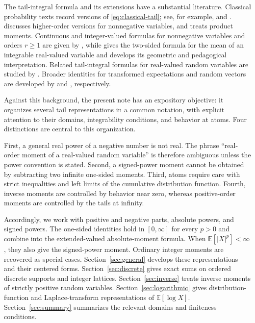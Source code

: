 \documentclass[11pt]{article}
\theoremstyle{definition}
\theoremstyle{remark}
\newcommand{\E}{\mathbb{E}}
\newcommand{\abs}[1]{\left\lvert #1\right\rvert}
\begin{document}
The tail-integral formula and its extensions have a substantial literature.
Classical probability texts record versions of \eqref{eq:classical-tail};
see, for example, \citet{Feller1971} and \citet{Shorack2000}.
\citet{Hong2012} discusses higher-order versions for nonnegative variables,
and \citet{Hong2015} treats product moments.  Continuous and integer-valued
formulas for nonnegative variables and orders $r\geq1$ are given by
\citet{Chakraborti2019},
while \citet[Proposition~2.1]{Lo2019} gives the two-sided formula for the
mean of an integrable real-valued variable and develops its geometric and
pedagogical interpretation.  Related tail-integral formulas for real-valued
random variables are studied by \citet{NadarajahOkorie2022}.  Broader
identities for transformed expectations and random vectors are developed by
\citet{Liu2020} and \citet{Ogasawara2020}, respectively.

Against this background, the present note has an expository objective: it
organizes several tail representations in a common notation, with explicit
attention to their domains, integrability conditions, and behavior at atoms.
Four distinctions are central to this organization.

First, a general real power of a negative number is not real.  The phrase
``real-order moment of a real-valued random variable'' is therefore
ambiguous unless the power convention is stated.  Second, a signed-power
moment cannot be obtained by subtracting two infinite one-sided moments.
Third, atoms require care with strict inequalities and left limits of the
cumulative distribution function.  Fourth, inverse moments are controlled
by behavior near zero, whereas positive-order moments are controlled by
the tails at infinity.

Accordingly, we work with positive and negative parts, absolute powers, and
signed powers.  The one-sided identities hold in $[0,\infty]$ for every
$p>0$ and combine into the extended-valued absolute-moment formula.  When
$\E[\abs{X}^p]<\infty$, they also give the signed-power moment.  Ordinary integer
moments are recovered as special cases.  Section~\ref{sec:general} develops
these representations and
their centered forms.  Section~\ref{sec:discrete} gives exact sums on ordered
discrete supports and integer lattices.  Section~\ref{sec:inverse} treats
inverse moments of strictly positive random variables.
Section~\ref{sec:logarithmic}
gives distribution-function and Laplace-transform representations of
$\E[\log X]$.  Section~\ref{sec:summary} summarizes the relevant domains and
finiteness conditions.
\end{document}
